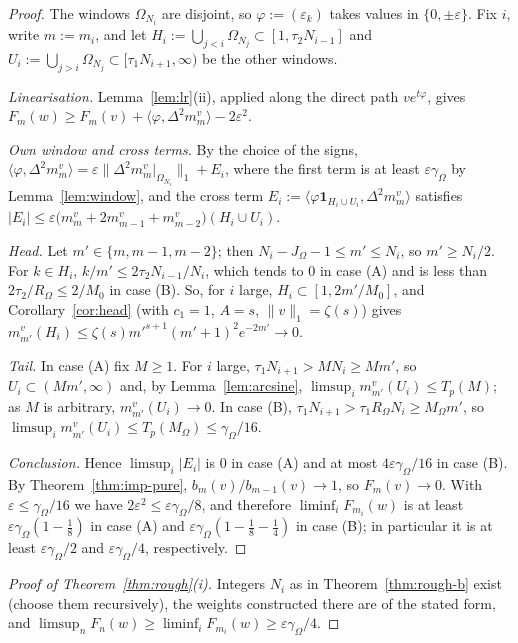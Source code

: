 \begin{proof}
The windows $\Omega_{N_i}$ are disjoint, so $\varphi:=(\varepsilon_k)$ takes values in $\{0,\pm\varepsilon\}$. Fix $i$, write
$m:=m_i$, and let $H_i:=\bigcup_{j<i}\Omega_{N_j}\subset[1,\tau_2N_{i-1}]$ and
$U_i:=\bigcup_{j>i}\Omega_{N_j}\subset[\tau_1N_{i+1},\infty)$ be the other windows.

\emph{Linearisation.} Lemma~\ref{lem:lr}(ii), applied along the direct path $ve^{t\varphi}$, gives
$F_m(w)\ge F_m(v)+\langle\varphi,\Delta^2m^v_m\rangle-2\varepsilon^2$.

\emph{Own window and cross terms.} By the choice of the signs,
$\langle\varphi,\Delta^2m^v_m\rangle=\varepsilon\|\Delta^2m^v_m|_{\Omega_{N_i}}\|_1+E_i$, where the first term is at least
$\varepsilon\gamma_\Omega$ by Lemma~\ref{lem:window}, and the cross term $E_i:=\langle\varphi\mathbf 1_{H_i\cup U_i},
\Delta^2m_m^v\rangle$ satisfies
$|E_i|\le\varepsilon\bigl(m^v_m+2m^v_{m-1}+m^v_{m-2}\bigr)(H_i\cup U_i)$.

\emph{Head.} Let $m'\in\{m,m-1,m-2\}$; then $N_i-J_\Omega-1\le m'\le N_i$, so $m'\ge N_i/2$. For $k\in H_i$,
$k/m'\le2\tau_2N_{i-1}/N_i$, which tends to $0$ in case (A) and is less than $2\tau_2/R_\Omega\le2/M_0$ in case (B). So, for
$i$ large, $H_i\subset[1,2m'/M_0]$, and Corollary~\ref{cor:head} (with $c_1=1$, $A=s$, $\|v\|_1=\zeta(s)$) gives
$m^v_{m'}(H_i)\le\zeta(s)m'^{s+1}(m'+1)^2e^{-2m'}\to0$.

\emph{Tail.} In case (A) fix $M\ge1$. For $i$ large, $\tau_1N_{i+1}>MN_i\ge Mm'$, so $U_i\subset(Mm',\infty)$ and,
by Lemma~\ref{lem:arcsine}, $\limsup_im^v_{m'}(U_i)\le T_p(M)$; as $M$ is arbitrary, $m^v_{m'}(U_i)\to0$. In case (B),
$\tau_1N_{i+1}>\tau_1R_\Omega N_i\ge M_\Omega m'$, so $\limsup_im^v_{m'}(U_i)\le T_p(M_\Omega)\le\gamma_\Omega/16$.

\emph{Conclusion.} Hence $\limsup_i|E_i|$ is $0$ in case (A) and at most $4\varepsilon\gamma_\Omega/16$ in case (B). By
Theorem~\ref{thm:imp-pure}, $b_m(v)/b_{m-1}(v)\to1$, so $F_m(v)\to0$. With $\varepsilon\le\gamma_\Omega/16$ we have
$2\varepsilon^2\le\varepsilon\gamma_\Omega/8$, and therefore $\liminf_iF_{m_i}(w)$ is at least
$\varepsilon\gamma_\Omega(1-\frac18)$ in case (A) and $\varepsilon\gamma_\Omega(1-\frac18-\frac14)$ in case (B); in particular it
is at least $\varepsilon\gamma_\Omega/2$ and $\varepsilon\gamma_\Omega/4$, respectively.
\end{proof}

\begin{proof}[Proof of Theorem~\ref{thm:rough}\textup{(i)}]
Integers $N_i$ as in Theorem~\ref{thm:rough-b} exist (choose them recursively), the weights constructed there are of
the stated form, and $\limsup_nF_n(w)\ge\liminf_iF_{m_i}(w)\ge\varepsilon\gamma_\Omega/4$.
\end{proof}

